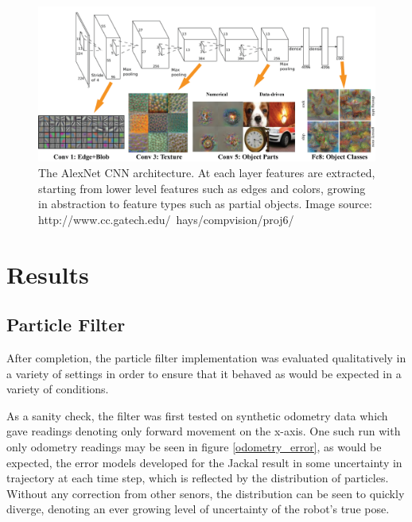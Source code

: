 \documentclass[letterpaper, 12 pt, conference]{ieeeconf}  %
\begin{document}
\begin{figure}[h]
\centering
\includegraphics[scale=0.70]{alexnet}
\caption{The AlexNet CNN architecture. At each layer features are extracted, starting from lower level features such as edges and colors, growing in abstraction to feature types such as partial objects. Image source: http://www.cc.gatech.edu/~hays/compvision/proj6/}
\end{figure}



\section{Results}

\subsection{Particle Filter}

After completion, the particle filter implementation was evaluated qualitatively in a variety of settings in order to ensure that it behaved as would be expected in a variety of conditions. 
\par
As a sanity check, the filter was first tested on synthetic odometry data which gave readings denoting only forward movement on the x-axis. One such run with only odometry readings may be seen in figure \ref{odometry_error}, as would be expected, the error models developed for the Jackal result in some uncertainty in trajectory at each time step, which is reflected by the distribution of particles. Without any correction from other senors, the distribution can be seen to quickly diverge, denoting an ever growing level of uncertainty of the robot's true pose. 
\end{document}
